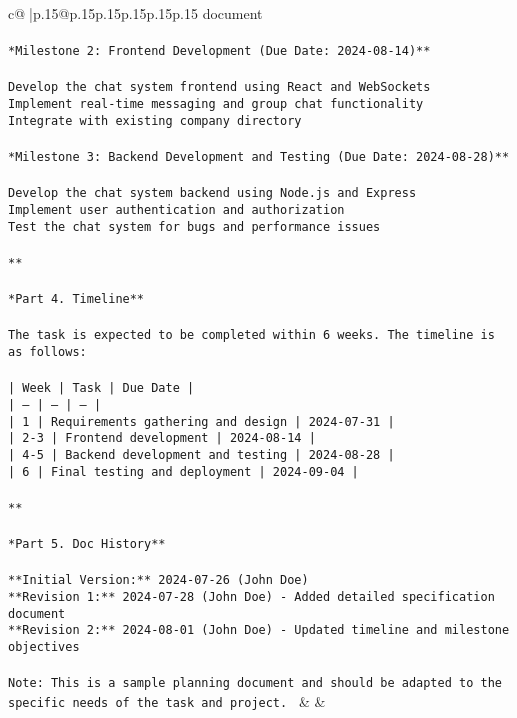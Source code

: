 \documentclass{article}
\begin{document}
{\begin{supertabular}{c@{$\;$}|p{.15\linewidth}@{}p{.15\linewidth}p{.15\linewidth}p{.15\linewidth}p{.15\linewidth}p{.15\linewidth}}
{{{document\\ \tt \\ \tt **Milestone 2: Frontend Development (Due Date: 2024-08-14)**\\ \tt \\ \tt * Develop the chat system frontend using React and WebSockets\\ \tt * Implement real-time messaging and group chat functionality\\ \tt * Integrate with existing company directory\\ \tt \\ \tt **Milestone 3: Backend Development and Testing (Due Date: 2024-08-28)**\\ \tt \\ \tt * Develop the chat system backend using Node.js and Express\\ \tt * Implement user authentication and authorization\\ \tt * Test the chat system for bugs and performance issues\\ \tt \\ \tt ***\\ \tt \\ \tt **Part 4. Timeline**\\ \tt \\ \tt The task is expected to be completed within 6 weeks. The timeline is as follows:\\ \tt \\ \tt | Week | Task | Due Date |\\ \tt | --- | --- | --- |\\ \tt | 1 | Requirements gathering and design | 2024-07-31 |\\ \tt | 2-3 | Frontend development | 2024-08-14 |\\ \tt | 4-5 | Backend development and testing | 2024-08-28 |\\ \tt | 6 | Final testing and deployment | 2024-09-04 |\\ \tt \\ \tt ***\\ \tt \\ \tt **Part 5. Doc History**\\ \tt \\ \tt * **Initial Version:** 2024-07-26 (John Doe)\\ \tt * **Revision 1:** 2024-07-28 (John Doe) - Added detailed specification document\\ \tt * **Revision 2:** 2024-08-01 (John Doe) - Updated timeline and milestone objectives\\ \tt \\ \tt Note: This is a sample planning document and should be adapted to the specific needs of the task and project. 
	  } 
	   } 
	   } 
	 & & \\ 
 


\end{supertabular}}
\end{document}
